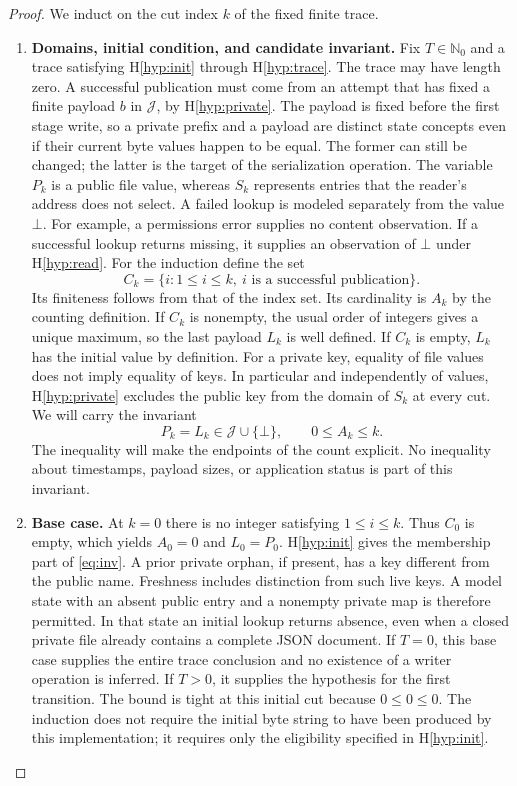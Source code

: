 \documentclass[12pt]{article}
\newcommand{\Valid}{\mathcal{J}}
\newcommand{\absent}{\bot}
\begin{document}
\begin{proof}
We induct on the cut index $k$ of the fixed finite trace.
\begin{enumerate}
\item \textbf{Domains, initial condition, and candidate invariant.}
Fix $T\in\mathbb{N}_0$ and a trace satisfying H\ref{hyp:init}
through H\ref{hyp:trace}. The trace may have length zero.
A successful publication must come from an attempt that has fixed
a finite payload $b$ in $\Valid$, by H\ref{hyp:private}.
The payload is fixed before the first stage write, so a private
prefix and a payload are distinct state concepts even if their
current byte values happen to be equal.
The former can still be changed; the latter is the target of
the serialization operation.
The variable $P_k$ is a public file value, whereas $S_k$
represents entries that the reader's address does not select.
A failed lookup is modeled separately from the value $\absent$.
For example, a permissions error supplies no content observation.
If a successful lookup returns missing, it supplies an observation
of $\absent$ under H\ref{hyp:read}.
For the induction define the set
\begin{equation}
\label{eq:commits}
C_k=\{i:1\leq i\leq k,\ i\text{ is a successful publication}\}.
\end{equation}
Its finiteness follows from that of the index set.
Its cardinality is $A_k$ by the counting definition.
If $C_k$ is nonempty, the usual order of integers gives a
unique maximum, so the last payload $L_k$ is well defined.
If $C_k$ is empty, $L_k$ has the initial value by definition.
For a private key, equality of file values does not imply
equality of keys. In particular and independently of values,
H\ref{hyp:private} excludes the public key from the domain of
$S_k$ at every cut.
We will carry the invariant
\begin{equation}
\label{eq:inv}
  P_k=L_k\in\Valid\cup\{\absent\},
  \qquad
  0\leq A_k\leq k .
\end{equation}
The inequality will make the endpoints of the count explicit.
No inequality about timestamps, payload sizes, or application
status is part of this invariant.

\item \textbf{Base case.}
At $k=0$ there is no integer satisfying $1\leq i\leq k$.
Thus $C_0$ is empty, which yields $A_0=0$ and $L_0=P_0$.
H\ref{hyp:init} gives the membership part of \eqref{eq:inv}.
A prior private orphan, if present, has a key different from the
public name. Freshness includes distinction from such live keys.
A model state with an absent public entry and a nonempty private
map is therefore permitted.
In that state an initial lookup returns absence, even when
a closed private file already contains a complete JSON document.
If $T=0$, this base case supplies the entire trace conclusion
and no existence of a writer operation is inferred.
If $T>0$, it supplies the hypothesis for the first transition.
The bound is tight at this initial cut because $0\leq0\leq0$.
The induction does not require the initial byte string to have
been produced by this implementation; it requires only the
eligibility specified in H\ref{hyp:init}.


\end{enumerate}
\end{proof}
\end{document}
